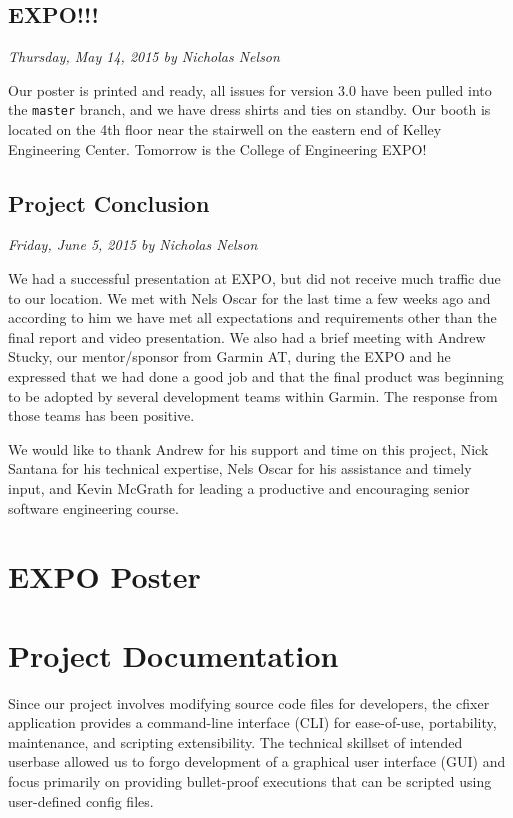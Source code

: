 \documentclass[11pt]{scrreprt}
\begin{document}
\section{EXPO!!!}
\textit{Thursday, May 14, 2015 by Nicholas Nelson}
\newline

Our poster is printed and ready, all issues for version 3.0 have been pulled into the \texttt{master} branch, and we have dress shirts and ties on standby. Our booth is located on the 4th floor near the stairwell on the eastern end of Kelley Engineering Center. Tomorrow is the College of Engineering EXPO!

\section{Project Conclusion}
\textit{Friday, June 5, 2015 by Nicholas Nelson}
\newline

We had a successful presentation at EXPO, but did not receive much traffic due to our location. We met with Nels Oscar for the last time a few weeks ago and according to him we have met all expectations and requirements other than the final report and video presentation. We also had a brief meeting with Andrew Stucky, our mentor/sponsor from Garmin AT, during the EXPO and he expressed that we had done a good job and that the final product was beginning to be adopted by several development teams within Garmin. The response from those teams has been positive.

We would like to thank Andrew for his support and time on this project, Nick Santana for his technical expertise, Nels Oscar for his assistance and timely input, and Kevin McGrath for leading a productive and encouraging senior software engineering course.

\chapter{EXPO Poster}

\chapter{Project Documentation}

Since our project involves modifying source code files for developers, the cfixer application provides a command-line interface (CLI) for ease-of-use, portability, maintenance, and scripting extensibility.
The technical skillset of intended userbase allowed us to forgo development of a graphical user interface (GUI) and focus primarily on providing bullet-proof executions that can be scripted using user-defined config files.
\end{document}
